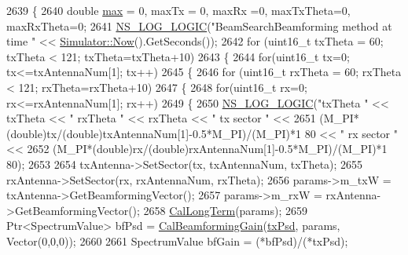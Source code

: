 \begin{DoxyCode}
2639 \{
2640         \textcolor{keywordtype}{double} \hyperlink{80211b_8c_affe776513b24d84b39af8ab0930fef7f}{max} = 0, maxTx = 0, maxRx =0, maxTxTheta=0, maxRxTheta=0;
2641         \hyperlink{group__logging_ga88acd260151caf2db9c0fc84997f45ce}{NS\_LOG\_LOGIC}(\textcolor{stringliteral}{"BeamSearchBeamforming method at time "} << 
      \hyperlink{classns3_1_1Simulator_ac3178fa975b419f7875e7105be122800}{Simulator::Now}().GetSeconds());
2642         \textcolor{keywordflow}{for} (uint16\_t txTheta = 60; txTheta < 121; txTheta=txTheta+10)
2643         \{
2644                 \textcolor{keywordflow}{for}(uint16\_t tx=0; tx<=txAntennaNum[1]; tx++)
2645                 \{
2646                         \textcolor{keywordflow}{for} (uint16\_t rxTheta = 60; rxTheta < 121; rxTheta=rxTheta+10)
2647                         \{
2648                                 \textcolor{keywordflow}{for}(uint16\_t rx=0; rx<=rxAntennaNum[1]; rx++)
2649                                 \{
2650                                         \hyperlink{group__logging_ga88acd260151caf2db9c0fc84997f45ce}{NS\_LOG\_LOGIC}(\textcolor{stringliteral}{"txTheta "} << txTheta << \textcolor{stringliteral}{" rxTheta "} << 
      rxTheta << \textcolor{stringliteral}{" tx sector "} << 
2651                                                 (M\_PI*(\textcolor{keywordtype}{double})tx/(\textcolor{keywordtype}{double})txAntennaNum[1]-0.5*M\_PI)/(M\_PI)*1
      80 << \textcolor{stringliteral}{" rx sector "} << 
2652                                                 (M\_PI*(\textcolor{keywordtype}{double})rx/(\textcolor{keywordtype}{double})rxAntennaNum[1]-0.5*M\_PI)/(M\_PI)*1
      80);
2653 
2654                                         txAntenna->SetSector(tx, txAntennaNum, txTheta);
2655                                         rxAntenna->SetSector(rx, rxAntennaNum, rxTheta);
2656                                         params->m\_txW = txAntenna->GetBeamformingVector();
2657                                         params->m\_rxW = rxAntenna->GetBeamformingVector();
2658                                         \hyperlink{classns3_1_1MmWave3gppChannel_ab1cacdfc31ed5b10bc2dc5206153ec57}{CalLongTerm}(params);
2659                                         Ptr<SpectrumValue> bfPsd = 
      \hyperlink{classns3_1_1MmWave3gppChannel_acd8bc1db086ba52b0e77ed71a6ccb56d}{CalBeamformingGain}(\hyperlink{lte__link__budget_8m_a684fe3101a5e48a5fcc57cab8dbcd1aa}{txPsd}, params, Vector(0,0,0));
2660 
2661                                         SpectrumValue bfGain = (*bfPsd)/(*txPsd);

\end{DoxyCode}
